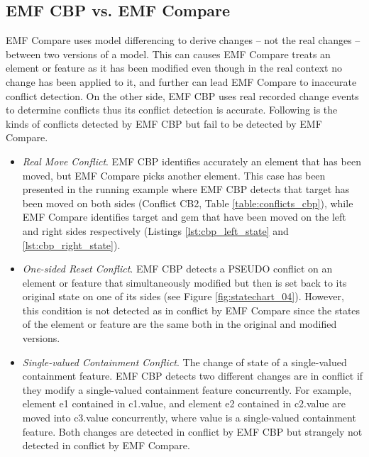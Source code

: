 \subsection{EMF CBP vs. EMF Compare}
\label{sec:emf_cbp_vs_emf_compare}
EMF Compare uses model differencing to derive changes -- not the real changes -- between two versions of a model. This can causes EMF Compare treats an element or feature as it has been modified even though in the real context no change has been applied to it, and further can lead EMF Compare to inaccurate conflict detection. On the other side, EMF CBP uses real recorded change events to determine conflicts thus its conflict detection is accurate. Following is the kinds of conflicts detected by EMF CBP but fail to be detected by EMF Compare. 
\begin{itemize}
  
  \item \emph{Real Move Conflict}. EMF CBP identifies accurately an element that has been moved, but EMF Compare picks another element. This case has been presented in the running example where EMF CBP detects that \textsf{target} has been moved on both sides (Conflict CB2, Table \ref{table:conflicts_cbp}), while EMF Compare identifies \textsf{target} and \textsf{gem} that have been moved on the left and right sides respectively (Listings \ref{lst:cbp_left_state} and \ref{lst:cbp_right_state}).
  
  \item \emph{One-sided Reset Conflict}. EMF CBP detects a \textsf{PSEUDO} conflict on an element or feature that simultaneously modified but then is set back to its original state on one of its sides (see Figure \ref{fig:statechart_04}). However, this condition is not detected as in conflict by EMF Compare since the states of the element or feature are the same both in the original and modified versions.   
  
  \item \emph{Single-valued Containment Conflict}. The change of state of a single-valued containment feature. EMF CBP detects two different changes are in conflict if they modify a single-valued containment feature concurrently. For example, element \textsf{e1} contained in \textsf{c1}.\textsf{value}, and element \textsf{e2} contained in \textsf{c2}.\textsf{value} are moved into \textsf{c3}.\textsf{value} concurrently, where \textsf{value} is a single-valued containment feature. Both changes are detected in conflict by EMF CBP but strangely not detected in conflict by EMF Compare.
\end{itemize}


